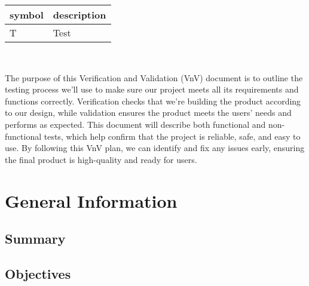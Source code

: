 \documentclass[12pt, titlepage]{article}
\begin{document}
\renewcommand{\arraystretch}{1.2}
\begin{tabular}{l l} 
  \toprule		
  \textbf{symbol} & \textbf{description}\\
  \midrule 
  T & Test\\
  \bottomrule
\end{tabular}\\



\newpage


The purpose of this Verification and Validation (VnV) document is to outline the testing process we’ll use to make sure our project meets all its requirements and functions correctly. Verification checks that we’re building the product according to our design, while validation ensures the product meets the users’ needs and performs as expected. This document will describe both functional and non-functional tests, which help confirm that the project is reliable, safe, and easy to use. By following this VnV plan, we can identify and fix any issues early, ensuring the final product is high-quality and ready for users.

\section{General Information}

\subsection{Summary}


\subsection{Objectives}

\end{document}
